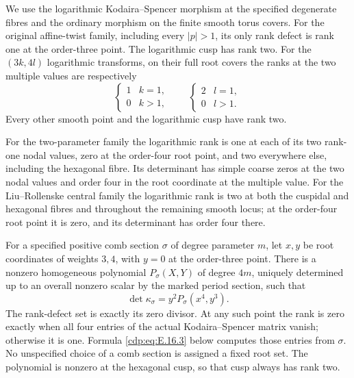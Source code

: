 
\begin{proposition}\label{cdp:st:E16}
We use the logarithmic Kodaira--Spencer morphism at the specified degenerate fibres and the ordinary morphism on the finite smooth torus covers. For the original affine-twist family, including every $|p|>1$, its only rank defect is rank one at the order-three point. The logarithmic cusp has rank two. For the $(3k,4l)$ logarithmic transforms, on their full root covers the ranks at the two multiple values are respectively
\[
 \begin{cases}1&k=1,\\0&k>1,\end{cases}
 \qquad
 \begin{cases}2&l=1,\\0&l>1.\end{cases}                 \tag{E.16.1}\label{cdp:eq:E.16.1}
\]
Every other smooth point and the logarithmic cusp have rank two.

For the two-parameter family the logarithmic rank is one at each of its two rank-one nodal values, zero at the order-four root point, and two everywhere else, including the hexagonal fibre. Its determinant has simple coarse zeros at the two nodal values and order four in the root coordinate at the multiple value. For the Liu--Rollenske central family the logarithmic rank is two at both the cuspidal and hexagonal fibres and throughout the remaining smooth locus; at the order-four root point it is zero, and its determinant has order four there.

For a specified positive comb section $\sigma$ of degree parameter $m$, let $x,y$ be root coordinates of weights $3,4$, with $y=0$ at the order-three point. There is a nonzero homogeneous polynomial $P_\sigma(X,Y)$ of degree $4m$, uniquely determined up to an overall nonzero scalar by the marked period section, such that
\[
 \det\kappa_\sigma=y^2P_\sigma(x^4,y^3).             \tag{E.16.2}\label{cdp:eq:E.16.2}
\]
The rank-defect set is exactly its zero divisor. At any such point the rank is zero exactly when all four entries of the actual Kodaira--Spencer matrix vanish; otherwise it is one. Formula \eqref{cdp:eq:E.16.3} below computes those entries from $\sigma$. No unspecified choice of a comb section is assigned a fixed root set. The polynomial is nonzero at the hexagonal cusp, so that cusp always has rank two.
\end{proposition}
